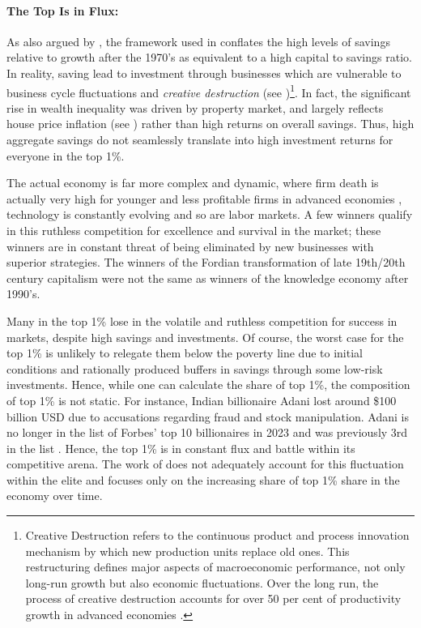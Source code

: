 \documentclass[12pt]{article}
\newcommand{\1}{\mathbbm 1}
\begin{document}
		
		
	
		
		\paragraph{The Top Is in Flux:}
		
		As also argued by \cite{soskice2014capital}, the framework used in \cite{piketty2017capital} conflates the high levels of savings relative to growth after the 1970's as equivalent to a high capital to savings ratio. In reality, saving lead to investment through businesses which are vulnerable to business cycle fluctuations and \textit{creative destruction} (see \cite{schumpeter1942})\footnote{Creative Destruction refers to the continuous product and process innovation mechanism by which new production units replace old ones. This restructuring defines major aspects of macroeconomic performance, not only long-run growth but also economic fluctuations. Over the long run, the process of creative destruction accounts for over 50 per cent of productivity growth in advanced economies \cite{soskice2014capital}.}. In fact, the significant rise in wealth inequality was driven by property market, and largely reflects house price inflation (see \cite{bonnet2014does}) rather than high returns on overall savings. Thus, high aggregate savings do not seamlessly translate into high investment returns for everyone in the top 1\%.
		
		
		
		
	
		The actual economy is far more complex and dynamic, where firm death is actually very high for younger and less profitable firms in advanced economies \cite{mckenzie2019small}, technology is constantly evolving and so are labor markets. A few winners qualify in this ruthless competition for excellence and survival in the market; these winners are in constant threat of being eliminated by new businesses with superior strategies. The winners of the Fordian transformation of late 19th/20th century capitalism  were not the same as winners of the knowledge economy after 1990's.
		
		 Many in the top 1\% lose in the volatile and ruthless competition for success in markets, despite high savings and investments. Of course, the worst case for the top 1\% is unlikely to relegate them below the poverty line due to initial conditions and rationally produced buffers in savings through some low-risk investments. Hence, while one can calculate the share of top 1\%, the composition of top 1\% is not static. For instance, Indian billionaire Adani lost around \$100 billion USD due to accusations regarding fraud and stock manipulation. Adani is no longer in the list of Forbes' top 10 billionaires in 2023 and was previously 3rd in the list \cite{adani2023}. Hence, the top 1\% is in constant flux and battle within its competitive arena. The work of \cite{piketty2017capital} does not adequately account for this fluctuation within the elite and focuses only on the increasing share of top 1\% share in the economy over time.
		
\end{document}
